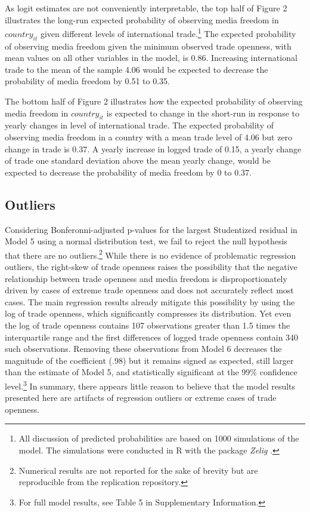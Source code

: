 \documentclass[12pt,a4paper]{article}\usepackage[]{graphicx}\usepackage[]{color}
\begin{document}
As logit estimates are not conveniently interpretable, the top half of Figure 2 illustrates the long-run expected probability of observing media freedom in $country_{it}$ given different levels of international trade.\footnote{All discussion of predicted probabilities are based on 1000 simulations of the model. The simulations were conducted in R with the package \emph{Zelig} \parencite*{ZeligEveryonesSt:2009ts}.} The expected probability of observing media freedom given the minimum observed trade openness, with mean values on all other variables in the model, is 0.86. Increasing international trade to the mean of the sample 4.06 would be expected to decrease the probability of media freedom by 0.51 to 0.35.

The bottom half of Figure 2 illustrates how the expected probability of observing media freedom in $country_{it}$ is expected to change in the short-run in response to yearly changes in level of international trade. The expected probability of observing media freedom in a country with a mean trade level of 4.06 but zero change in trade is 0.37. A yearly increase in logged trade of 0.15, a yearly change of trade one standard deviation above the mean yearly change, would be expected to decrease the probability of media freedom by 0 to 0.37.



\subsection{Outliers}

Considering Bonferonni-adjusted p-values for the largest Studentized residual in Model 5 using a normal distribution test, we fail to reject the null hypothesis that there are no outliers.\footnote{Numerical results are not reported for the sake of brevity but are reproducible from the replication repository.} While there is no evidence of problematic regression outliers, the right-skew of trade openness raises the possibility that the negative relationship between trade openness and media freedom is disproportionately driven by cases of extreme trade openness and does not accurately reflect most cases. The main regression results already mitigate this possibility by using the log of trade openness, which significantly compresses its distribution. Yet even the log of trade openness contains 107 observations greater than 1.5 times the interquartile range and the first differences of logged trade openness contain 340 such observations. Removing these observations from Model 6 decreases the magnitude of the coefficient (.98) but it remains signed as expected, still larger than the estimate of Model 5, and statistically significant at the 99\% confidence level.\footnote{For full model results, see Table 5 in Supplementary Information.} In summary, there appears little reason to believe that the model results presented here are artifacts of regression outliers or extreme cases of trade openness.
\end{document}
